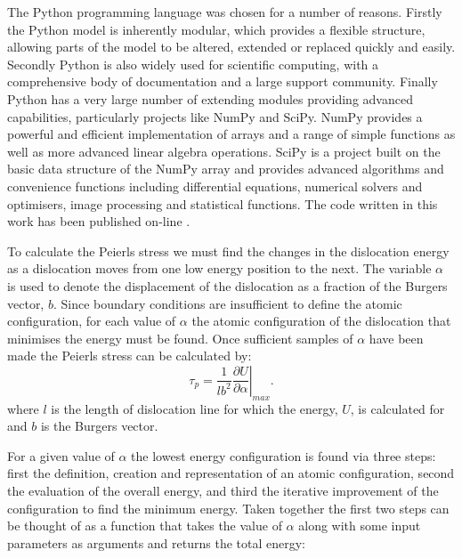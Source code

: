 The Python programming language was chosen for a number of reasons. Firstly the Python model is inherently modular, which provides a flexible structure, allowing parts of the model to be altered, extended or replaced quickly and easily. Secondly Python is also widely used for scientific computing, with a comprehensive body of documentation and a large support community. Finally Python has a very large number of extending modules providing advanced capabilities, particularly projects like NumPy and SciPy. NumPy provides a powerful and efficient implementation of arrays and a range of simple functions as well as more advanced linear algebra operations. SciPy is a project built on the basic data structure of the NumPy array and provides advanced algorithms and convenience functions including differential equations, numerical solvers and optimisers, image processing and statistical functions. The code written in this work has been published on-line \cite{code}. 

To calculate the Peierls stress we must find the changes in the dislocation energy as a dislocation moves from one low energy position to the next. The variable $\alpha$ is used to denote the  displacement of the dislocation as a fraction of the Burgers vector, $b$. Since boundary conditions are insufficient to define the atomic configuration, for each value of $\alpha$ the atomic configuration of the dislocation that minimises the energy must be found. Once sufficient samples of $\alpha$ have been made the Peierls stress can be calculated by:
\begin{equation}
\tau_p = \frac{1}{lb^2}   \left. \frac{\partial U}{\partial \alpha} \right|_{max} .
\end{equation}
where $l$ is the length of dislocation line for which the energy, $U$, is calculated for and $b$ is the Burgers vector.

For a given value of $\alpha$ the lowest energy configuration is found via three steps: first the definition, creation and representation of an atomic configuration, second the evaluation of the overall energy, and third the iterative improvement of the configuration to find the minimum energy. Taken together the first two steps can be thought of as a function that takes the value of $\alpha$ along with some input parameters as arguments and returns the total energy:


